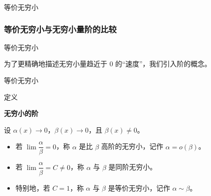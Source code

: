 \documentclass[aspectratio=169,10pt,fontset=fandol]{ctexbeamer}
\newenvironment{custom}[1]{\par\noindent\textbf{#1}\quad}{\par\vspace{0.8em}}
\begin{document}
\begin{frame}[t,fragile]{等价无穷小}
\footnotesize
{\footnotesize
\subsubsection{等价无穷小与无穷小量阶的比较}


}
\end{frame}
\begin{frame}[t,fragile]{等价无穷小}
\footnotesize
{\footnotesize
为了更精确地描述无穷小量趋近于 0 的“速度”，我们引入阶的概念。


}
\end{frame}
\begin{frame}[t,fragile]{等价无穷小}
\footnotesize
\begin{block}{定义}
{\footnotesize
\textbf{无穷小的阶}\par

设 \(\alpha(x) \to 0\)，\(\beta(x) \to 0\)，且 \(\beta(x) \neq 0\)。
\begin{itemize}
\item 若 \(\lim \dfrac{\alpha}{\beta} = 0\)，称 \(\alpha\) 是比 \(\beta\) 高阶的无穷小，记作 \(\alpha = o(\beta)\)。
\item 若 \(\lim \dfrac{\alpha}{\beta} = C \neq 0\)，称 \(\alpha\) 与 \(\beta\) 是同阶无穷小。
\item 特别地，若 \(C = 1\)，称 \(\alpha\) 与 \(\beta\) 是等价无穷小，记作 \(\alpha \sim \beta\)。
\end{itemize}

}
\end{block}
\end{frame}
\end{document}
